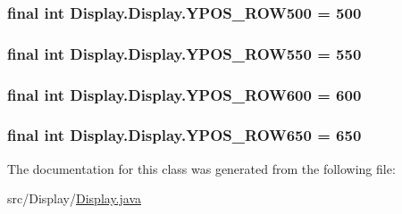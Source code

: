 \subsubsection[{Y\+P\+O\+S\+\_\+\+R\+O\+W500}]{\setlength{\rightskip}{0pt plus 5cm}final int Display.\+Display.\+Y\+P\+O\+S\+\_\+\+R\+O\+W500 = 500\hspace{0.3cm}{\ttfamily [static]}}\label{class_display_1_1_display_af69167585902297bf72bccb89eac59ad}
\hypertarget{class_display_1_1_display_a18e8f506bdeb1ffce18d4e17eacfc1c9}{}
\subsubsection[{Y\+P\+O\+S\+\_\+\+R\+O\+W550}]{\setlength{\rightskip}{0pt plus 5cm}final int Display.\+Display.\+Y\+P\+O\+S\+\_\+\+R\+O\+W550 = 550\hspace{0.3cm}{\ttfamily [static]}}\label{class_display_1_1_display_a18e8f506bdeb1ffce18d4e17eacfc1c9}
\hypertarget{class_display_1_1_display_aeb7358eb4ef9314e129e3636eaee48b2}{}
\subsubsection[{Y\+P\+O\+S\+\_\+\+R\+O\+W600}]{\setlength{\rightskip}{0pt plus 5cm}final int Display.\+Display.\+Y\+P\+O\+S\+\_\+\+R\+O\+W600 = 600\hspace{0.3cm}{\ttfamily [static]}}\label{class_display_1_1_display_aeb7358eb4ef9314e129e3636eaee48b2}
\hypertarget{class_display_1_1_display_a60296fc1277e58422d02f8f462ad95c5}{}
\subsubsection[{Y\+P\+O\+S\+\_\+\+R\+O\+W650}]{\setlength{\rightskip}{0pt plus 5cm}final int Display.\+Display.\+Y\+P\+O\+S\+\_\+\+R\+O\+W650 = 650\hspace{0.3cm}{\ttfamily [static]}}\label{class_display_1_1_display_a60296fc1277e58422d02f8f462ad95c5}


The documentation for this class was generated from the following file\+:\begin{DoxyCompactItemize}
\item 
src/\+Display/\hyperlink{_display_8java}{Display.\+java}\end{DoxyCompactItemize}
